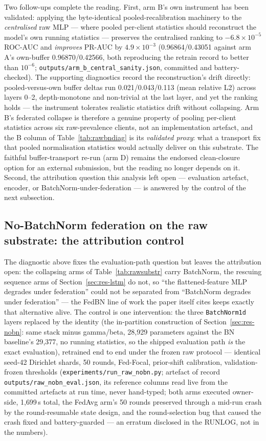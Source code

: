 Two follow-ups complete the reading. First, arm B's own instrument
has been validated: applying the byte-identical
pooled-recalibration machinery to the \emph{centralised} raw MLP ---
where pooled per-client statistics should reconstruct the model's own
running statistics --- preserves the centralised ranking to
$-6.8\times10^{-5}$ ROC-AUC and \emph{improves} PR-AUC by
$4.9\times10^{-3}$ (0.96864/0.43051 against arm A's own-buffer
0.96870/0.42566, both reproducing the retrain record to better than
$10^{-6}$; \texttt{outputs/arm\_b\_central\_sanity.json}, committed
and battery-checked). The supporting diagnostics record the
reconstruction's drift directly: pooled-versus-own buffer deltas run
0.021/0.043/0.113 (mean relative L2) across layers 0--2,
depth-monotone and non-trivial at the last layer, and yet the ranking
holds --- the instrument tolerates realistic statistics drift without
collapsing. Arm B's federated collapse is therefore a genuine
property of pooling per-client statistics across six
raw-prevalence clients, not an implementation artefact, and the B
column of Table~\ref{tab:rawbndiag} is its \emph{validated proxy}:
what a transport fix that pooled normalisation statistics would
actually deliver on this substrate. The faithful buffer-transport
re-run (arm D) remains the endorsed clean-closure option for an
external submission, but the reading no longer depends on it.
Second, the attribution question this analysis left open ---
evaluation artefact, encoder, or BatchNorm-under-federation --- is
answered by the control of the next subsection.

\subsection{No-BatchNorm federation on the raw substrate: the
attribution control}
\label{sec:res-rawnobn}

The diagnostic above fixes the evaluation-path question but leaves
the attribution open: the collapsing arms of
Table~\ref{tab:rawsubstr} carry BatchNorm, the rescuing sequence arms
of Section~\ref{sec:res-lstm} do not, so ``the flattened-feature MLP
degrades under federation'' could not be separated from ``BatchNorm
degrades under federation'' --- the FedBN line of work the paper
itself cites keeps exactly that alternative alive. The control is one
intervention: the three \texttt{BatchNorm1d} layers replaced by the
identity (the in-partition construction of
Section~\ref{sec:res-nobn}: same stack minus gamma/beta, 28{,}929
parameters against the BN baseline's 29{,}377, no running statistics,
so the shipped evaluation path \emph{is} the exact evaluation),
retrained end to end under the frozen raw protocol --- identical
seed-42 Dirichlet shards, 50 rounds, Fed-Focal, prior-shift
calibration, validation-frozen thresholds
(\texttt{experiments/run\_raw\_nobn.py}; artefact of record
\texttt{outputs/raw\_nobn\_eval.json}, its reference columns read
live from the committed artefacts at run time, never hand-typed; both
arms executed owner-side, 1{,}699\,s total, the FedAvg arm's 50
rounds preserved through a mid-run crash by the round-resumable state
design, and the round-selection bug that caused the crash fixed and
battery-guarded --- an erratum disclosed in the RUNLOG, not
in the numbers).

